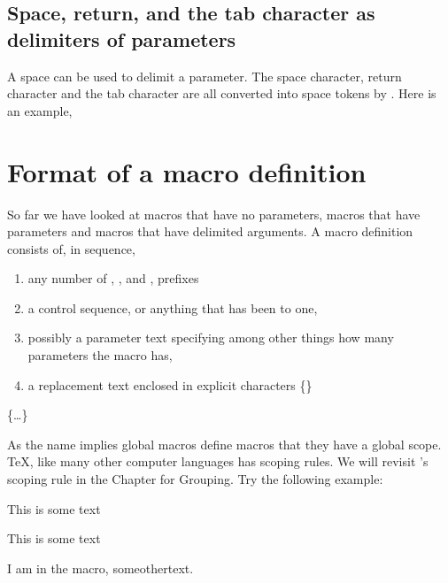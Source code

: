 \subsection{Space, return, and the tab character as delimiters of parameters}

A space can be used to delimit a parameter. The space character, return character and the tab character are all converted into space tokens by \tex. Here is an example,



\section{Format of a macro definition}

So far we have looked at macros that have no parameters, macros that have parameters and macros that have delimited arguments. A macro definition consists of, in sequence,

\begin{enumerate}
\item any number of \cmd{\global}, \cmd{\long}, and \cmd{\outer}, prefixes
\item a \cmd{\def} control sequence, or anything that has been \cmd{\let} to one,
\item possibly a parameter text specifying among other things how many parameters the macro has,
\item a replacement text enclosed in explicit characters \{\}
\end{enumerate}


\CMDI{\global}\cmd{\def}\{\ldots\}

As the name implies global macros define macros that they have a global scope. \TeX, like many other computer languages has scoping rules. We will revisit \tex's scoping rule in the Chapter for Grouping.  Try the following example:


\begin{teX}
\def\sometext{This is some text}
\def\someothertext{%
   \def\sometext{I am in the macro, someothertext.}\par
   \sometext
}
\sometext
\end{teX}

\def\sometext{This is some text}
\def\someothertext{%
   \def\sometext{I am in the macro, someothertext.}\par
   \sometext
}
\sometext
\someothertext


